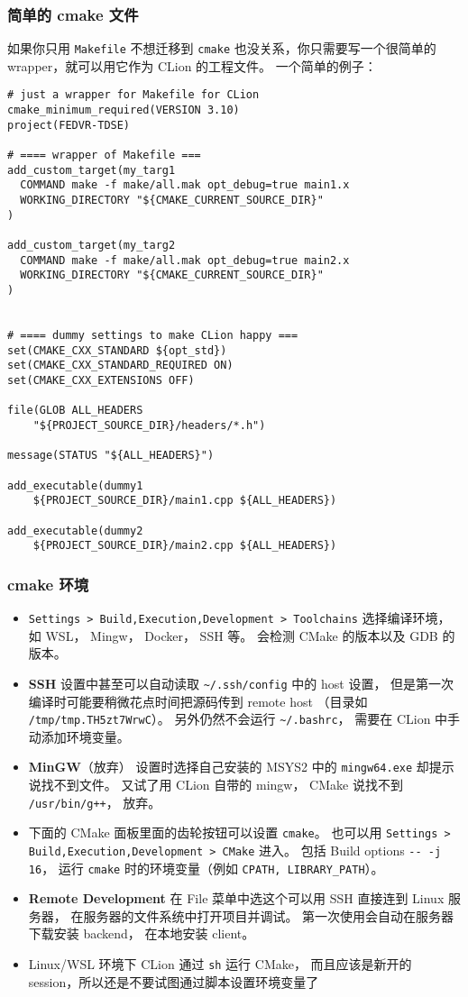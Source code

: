 \subsubsection{简单的 cmake 文件}
如果你只用 \verb|Makefile| 不想迁移到 \verb|cmake| 也没关系，你只需要写一个很简单的 wrapper，就可以用它作为 CLion 的工程文件。 一个简单的例子：
\begin{lstlisting}[language=none]
# just a wrapper for Makefile for CLion
cmake_minimum_required(VERSION 3.10)
project(FEDVR-TDSE)

# ==== wrapper of Makefile ===
add_custom_target(my_targ1
  COMMAND make -f make/all.mak opt_debug=true main1.x
  WORKING_DIRECTORY "${CMAKE_CURRENT_SOURCE_DIR}"
)

add_custom_target(my_targ2
  COMMAND make -f make/all.mak opt_debug=true main2.x
  WORKING_DIRECTORY "${CMAKE_CURRENT_SOURCE_DIR}"
)


# ==== dummy settings to make CLion happy ===
set(CMAKE_CXX_STANDARD ${opt_std})
set(CMAKE_CXX_STANDARD_REQUIRED ON)
set(CMAKE_CXX_EXTENSIONS OFF)

file(GLOB ALL_HEADERS
    "${PROJECT_SOURCE_DIR}/headers/*.h")

message(STATUS "${ALL_HEADERS}")

add_executable(dummy1
    ${PROJECT_SOURCE_DIR}/main1.cpp ${ALL_HEADERS})

add_executable(dummy2
    ${PROJECT_SOURCE_DIR}/main2.cpp ${ALL_HEADERS})
\end{lstlisting}

\subsubsection{cmake 环境}
\begin{itemize}
\item \verb|Settings > Build,Execution,Development > Toolchains| 选择编译环境， 如 WSL， Mingw， Docker， SSH 等。 会检测 CMake 的版本以及 GDB 的版本。
\item \textbf{SSH} 设置中甚至可以自动读取 \verb|~/.ssh/config| 中的 host 设置， 但是第一次编译时可能要稍微花点时间把源码传到 remote host （目录如 \verb|/tmp/tmp.TH5zt7WrwC|）。 另外仍然不会运行 \verb|~/.bashrc|， 需要在 CLion 中手动添加环境变量。
\item \textbf{MinGW}（放弃） 设置时选择自己安装的 MSYS2 中的 \verb|mingw64.exe| 却提示说找不到文件。 又试了用 CLion 自带的 mingw， CMake 说找不到 \verb|/usr/bin/g++|， 放弃。
\item 下面的 CMake 面板里面的齿轮按钮可以设置 \verb|cmake|。 也可以用 \verb|Settings > Build,Execution,Development > CMake| 进入。 包括 Build options \verb|-- -j 16|， 运行 \verb|cmake| 时的环境变量（例如 \verb|CPATH, LIBRARY_PATH|）。
\item \textbf{Remote Development} 在 File 菜单中选这个可以用 SSH 直接连到 Linux 服务器， 在服务器的文件系统中打开项目并调试。 第一次使用会自动在服务器下载安装 backend， 在本地安装 client。
\item Linux/WSL 环境下 CLion 通过 \verb|sh| 运行 CMake， 而且应该是新开的 session，所以还是不要试图通过脚本设置环境变量了
\end{itemize}

